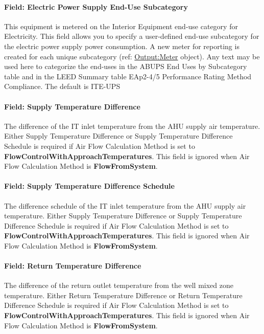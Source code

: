 \paragraph{Field: Electric Power Supply End-Use Subcategory}\label{field-electric-power-supply-end-use-subcategory}

This equipment is metered on the Interior Equipment end-use category for Electricity. This field allows you to specify a user-defined end-use subcategory for the electric power supply power consumption. A new meter for reporting is created for each unique subcategory (ref: \hyperref[outputmeter-and-outputmetermeterfileonly]{Output:Meter} object). Any text may be used here to categorize the end-uses in the ABUPS End Uses by Subcategory table and in the LEED Summary table EAp2-4/5 Performance Rating Method Compliance. The default is ITE-UPS

\paragraph{Field: Supply Temperature Difference}\label{field-supply-temperature-difference}

The difference of the IT inlet temperature from the AHU supply air temperature. Either Supply Temperature Difference or Supply Temperature Difference Schedule is required if Air Flow Calculation Method is set to \textbf{FlowControlWithApproachTemperatures}. This field is ignored when Air Flow Calculation Method is \textbf{FlowFromSystem}.

\paragraph{Field: Supply Temperature Difference Schedule}\label{field-supply-temperature-difference-schedule}

The difference schedule of the IT inlet temperature from the AHU supply air temperature. Either Supply Temperature Difference or Supply Temperature Difference Schedule is required if Air Flow Calculation Method is set to \textbf{FlowControlWithApproachTemperatures}. This field is ignored when Air Flow Calculation Method is \textbf{FlowFromSystem}.

\paragraph{Field: Return Temperature Difference}\label{field-return-temperature-difference}

The difference of the return outlet temperature from the well mixed zone temperature. Either Return Temperature Difference or Return Temperature Difference Schedule is required if Air Flow Calculation Method is set to \textbf{FlowControlWithApproachTemperatures}. This field is ignored when Air Flow Calculation Method is \textbf{FlowFromSystem}.

